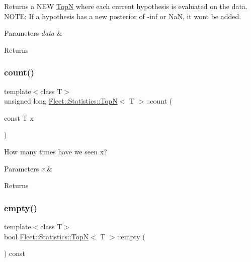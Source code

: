 Returns a N\+EW \hyperlink{class_fleet_1_1_statistics_1_1_top_n}{TopN} where each current hypothesis is evaluated on the data. N\+O\+TE\+: If a hypothesis has a new posterior of -\/inf or NaN, it won\textquotesingle{}t be added. 
\begin{DoxyParams}{Parameters}
{\em data} & \\
\hline
\end{DoxyParams}
\begin{DoxyReturn}{Returns}

\end{DoxyReturn}
\mbox{\label{class_fleet_1_1_statistics_1_1_top_n_a341df027d3283fe3a9bf3766521e126d}} 
\subsubsection{\texorpdfstring{count()}{count()}}
{\footnotesize\ttfamily template$<$class T$>$ \\
unsigned long \hyperlink{class_fleet_1_1_statistics_1_1_top_n}{Fleet\+::\+Statistics\+::\+TopN}$<$ T $>$\+::count (\begin{DoxyParamCaption}\item[{const T}]{x }\end{DoxyParamCaption})\hspace{0.3cm}{\ttfamily [inline]}}

How many times have we seen x? 
\begin{DoxyParams}{Parameters}
{\em x} & \\
\hline
\end{DoxyParams}
\begin{DoxyReturn}{Returns}

\end{DoxyReturn}
\mbox{\label{class_fleet_1_1_statistics_1_1_top_n_ac2b70eef6c75a0459acc88b2539dbc0b}} 
\subsubsection{\texorpdfstring{empty()}{empty()}}
{\footnotesize\ttfamily template$<$class T$>$ \\
bool \hyperlink{class_fleet_1_1_statistics_1_1_top_n}{Fleet\+::\+Statistics\+::\+TopN}$<$ T $>$\+::empty (\begin{DoxyParamCaption}{ }\end{DoxyParamCaption}) const\hspace{0.3cm}{\ttfamily [inline]}}

